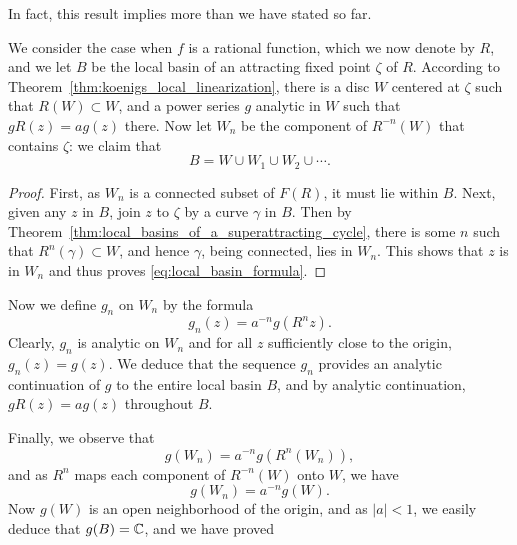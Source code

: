 In fact, this result implies more than we have stated so far.

\begin{remark}[$B = W \cup W_1 \cup W_2 \cup \cdots$]
    We consider the case when $f$ is a rational function, which we now denote by
    $R$, and we let $B$ be the local basin of an attracting fixed point $\zeta$
    of $R$. According to Theorem~\ref{thm:koenigs_local_linearization}, there is
    a disc $W$ centered at $\zeta$ such that $R(W) \subset W$, and a power
    series $g$ analytic in $W$ such that $g R(z) = a g(z)$ there. Now let $W_n$
    be the component of $R^{-n}(W)$ that contains $\zeta$: we claim that
    \begin{equation}
        \label{eq:local_basin_formula}
        B = W \cup W_1 \cup W_2 \cup \cdots .
    \end{equation}
\end{remark}
\begin{proof}
    First, as $W_n$ is a connected subset of $F(R)$, it must lie within $B$.
    Next, given any $z$ in $B$, join $z$ to $\zeta$ by a curve $\gamma$ in $B$.
    Then by Theorem~\ref{thm:local_basins_of_a_superattracting_cycle}, there is
    some $n$ such that $R^n(\gamma) \subset W$, and hence $\gamma$, being
    connected, lies in $W_n$. This shows that $z$ is in $W_n$ and thus proves
    \eqref{eq:local_basin_formula}.
\end{proof}

\begin{remark}
    Now we define $g_n$ on $W_n$ by the formula
    \begin{equation*}
        g_n(z) = a^{-n} g(R^n z).
    \end{equation*}
    Clearly, $g_n$ is analytic on $W_n$ and for all $z$ sufficiently close to
    the origin, $g_n(z) = g(z)$. We deduce that the sequence $g_n$ provides an
    analytic continuation of $g$ to the entire local basin $B$, and by analytic
    continuation, $g R(z) = a g(z)$ throughout $B$.
\end{remark}

Finally, we observe that
\begin{equation*}
    g(W_n) = a^{-n} g(R^n(W_n)),
\end{equation*}
and as $R^n$ maps each component of $R^{-n}(W)$ onto $W$, we have
\begin{equation*}
    g(W_n) = a^{-n} g(W).
\end{equation*}
Now $g(W)$ is an open neighborhood of the origin, and as $|a| < 1$, we easily
deduce that $g(B) = \mathbb{C}$, and we have proved

